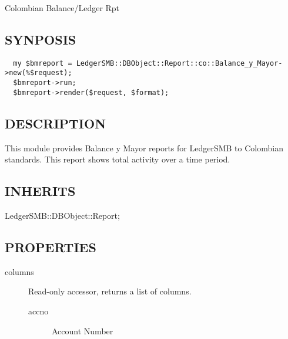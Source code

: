 \begin{description}
Colombian Balance/Ledger Rpt

\subsection*{SYNPOSIS\label{LedgerSMB::DBObject::Report::co::Balance_y_Mayor_SYNPOSIS}}
\begin{verbatim}
  my $bmreport = LedgerSMB::DBObject::Report::co::Balance_y_Mayor->new(%$request);
  $bmreport->run;
  $bmreport->render($request, $format);
\end{verbatim}
\subsection*{DESCRIPTION\label{LedgerSMB::DBObject::Report::co::Balance_y_Mayor_DESCRIPTION}}


This module provides Balance y Mayor reports for LedgerSMB to Colombian 
standards. This report shows total activity over a time period.

\subsection*{INHERITS\label{LedgerSMB::DBObject::Report::co::Balance_y_Mayor_INHERITS}}
\begin{description}

\item[{LedgerSMB::DBObject::Report;}] \mbox{}\end{description}
\subsection*{PROPERTIES\label{LedgerSMB::DBObject::Report::co::Balance_y_Mayor_PROPERTIES}}
\begin{description}

\item[{columns}] \mbox{}

Read-only accessor, returns a list of columns.

\begin{description}

\item[{accno}] \mbox{}

Account Number



\end{description}
\end{description}
\end{description}
